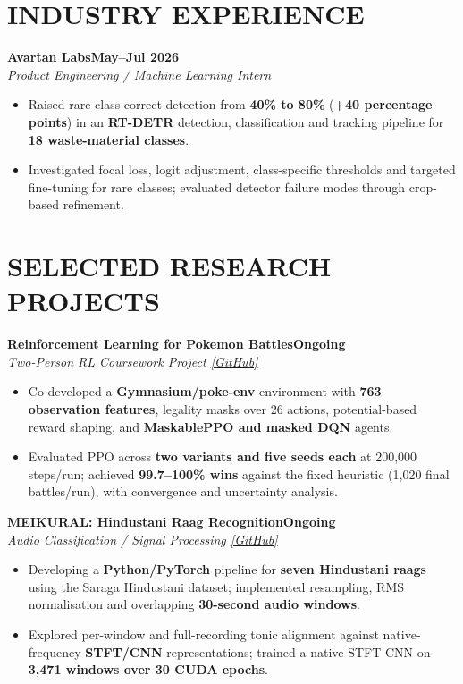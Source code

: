 \documentclass[10pt,a4paper]{article}
\newcommand{\entry}[3]{\noindent\textbf{#1}\hfill\textbf{#3}\\[-1pt]\textit{#2}\par}
\newenvironment{cvitems}{\begin{itemize}[leftmargin=1.1em,label=\textbullet,itemsep=2pt,topsep=3pt,parsep=0pt,partopsep=0pt]}{\end{itemize}}
\begin{document}
\section{INDUSTRY EXPERIENCE}
\entry{Avartan Labs}{Product Engineering / Machine Learning Intern}{May--Jul 2026}
\begin{cvitems}
  \item Raised rare-class correct detection from \textbf{40\% to 80\%} (\textbf{+40 percentage points}) in an \textbf{RT-DETR} detection, classification and tracking pipeline for \textbf{18 waste-material classes}.
  \item Investigated focal loss, logit adjustment, class-specific thresholds and targeted fine-tuning for rare classes; evaluated detector failure modes through crop-based refinement.
\end{cvitems}
\section{SELECTED RESEARCH PROJECTS}
\entry{Reinforcement Learning for Pokemon Battles}{Two-Person RL Coursework Project \href{https://github.com/Kabir1607/RL_MidSem_Kabir_Aarush}{[GitHub]}}{Ongoing}
\begin{cvitems}
  \item Co-developed a \textbf{Gymnasium/poke-env} environment with \textbf{763 observation features}, legality masks over 26 actions, potential-based reward shaping, and \textbf{MaskablePPO and masked DQN} agents.
  \item Evaluated PPO across \textbf{two variants and five seeds each} at 200,000 steps/run; achieved \textbf{99.7--100\% wins} against the fixed heuristic (1,020 final battles/run), with convergence and uncertainty analysis.
\end{cvitems}
\entry{MEIKURAL: Hindustani Raag Recognition}{Audio Classification / Signal Processing \href{https://github.com/MushuRam01/MEIKURAL}{[GitHub]}}{Ongoing}
\begin{cvitems}
  \item Developing a \textbf{Python/PyTorch} pipeline for \textbf{seven Hindustani raags} using the Saraga Hindustani dataset; implemented resampling, RMS normalisation and overlapping \textbf{30-second audio windows}.
  \item Explored per-window and full-recording tonic alignment against native-frequency \textbf{STFT/CNN} representations; trained a native-STFT CNN on \textbf{3,471 windows over 30 CUDA epochs}.
\end{cvitems}
\end{document}

